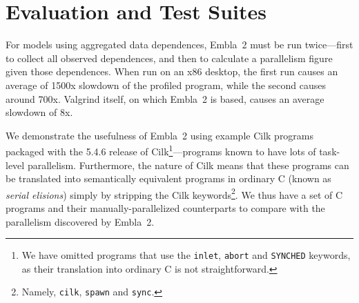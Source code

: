 \section{Evaluation and Test Suites} \label{sresults}

For models using aggregated data dependences, Embla~2 must be run twice---first
to collect all observed dependences, and then to calculate a parallelism figure
given those dependences. When run on an x86 desktop, the first run causes an
average of 1500x slowdown of the profiled program, while the second causes
around 700x. 
Valgrind itself, on which Embla~2 is based, causes an average slowdown of
8x.

We demonstrate the usefulness of Embla~2 using example Cilk programs packaged with the 5.4.6 release of Cilk\footnote{We
have omitted programs that use the \texttt{inlet}, \texttt{abort} and \texttt{SYNCHED} keywords,
as their translation into ordinary C is not straightforward.}---programs known to have lots of task-level parallelism.
Furthermore, the nature of Cilk means that these programs can be translated into semantically equivalent programs in ordinary C (known as \emph{serial elisions}) simply by stripping the Cilk keywords\footnote{Namely,
\texttt{cilk}, \texttt{spawn} and \texttt{sync}.}.
We thus have a set of C programs and their manually-parallelized counterparts to compare with the parallelism discovered by Embla~2.


